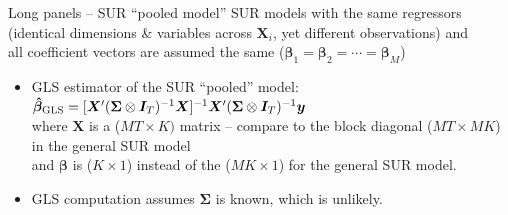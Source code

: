 \documentclass[usenames,dvipsnames]{beamer}
\begin{document}
\begin{frame}{Long panels -- SUR ``pooled model''}
\small
SUR models with the same regressors (identical dimensions \& variables across $\bm{X}_i$, yet different observations) and \\
all coefficient vectors are assumed the same ($\bm{\beta}_1=\bm{\beta}_2=\cdots=\bm{\beta}_M$)\\ \bigskip
\begin{itemize}
    \item GLS estimator of the SUR ``pooled'' model:\\ \bigskip
    $\bm{\hat{\beta}}_{\textnormal{GLS}} = [\bm{X}^{\prime} (\bm{\Sigma} \otimes \bm{I}_T)^{-1} \bm{X}]^{-1} \bm{X}^{\prime} (\bm{\Sigma} \otimes \bm{I}_T)^{-1} \bm{y}$ 
    \\ \medskip
    where $\bm{X}$ is a ($MT\times K)$ matrix -- compare to the block diagonal ($MT \times MK$) in the general SUR model\\ \medskip
    and $\bm{\beta}$ is ($K\times 1$) instead of the ($MK\times 1$) for the general SUR model.\\
    \bigskip
    \item GLS computation assumes $\bm{\Sigma}$ is known, which is unlikely.
\end{itemize}
\end{frame}
\end{document}
